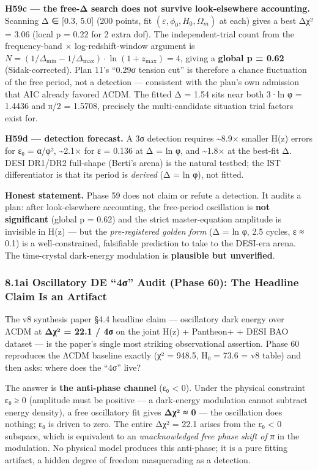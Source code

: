 \documentclass[
]{article}
\begin{document}
\textbf{H59c --- the free-Δ search does not survive look-elsewhere
accounting.} Scanning Δ ∈ {[}0.3, 5.0{]} (200 points, fit
\((\varepsilon,\phi_0,H_0,\Omega_m)\) at each) gives a best Δχ² = 3.06
(local p = 0.22 for 2 extra dof). The independent-trial count from the
frequency-band × log-redshift-window argument is
\(N = (1/\Delta_{\min}-1/\Delta_{\max})\cdot\ln(1+z_{\max}) = 4\),
giving a \textbf{global p = 0.62} (Sidak-corrected). Plan 11's ``0.29σ
tension cut'' is therefore a chance fluctuation of the free period, not
a detection --- consistent with the plan's own admission that AIC
already favored ΛCDM. The fitted Δ = 1.54 sits near both 3·ln φ = 1.4436
and π/2 = 1.5708, precisely the multi-candidate situation trial factors
exist for.

\textbf{H59d --- detection forecast.} A 3σ detection requires
\textasciitilde8.9× smaller H(z) errors for ε₀ = α/φ²,
\textasciitilde2.1× for ε = 0.136 at Δ = ln φ, and \textasciitilde1.8×
at the best-fit Δ. DESI DR1/DR2 full-shape (Berti's arena) is the
natural testbed; the IST differentiator is that its period is
\emph{derived} (Δ = ln φ), not fitted.

\textbf{Honest statement.} Phase 59 does not claim or refute a
detection. It audits a plan: after look-elsewhere accounting, the
free-period oscillation is \textbf{not significant} (global p = 0.62)
and the strict master-equation amplitude is invisible in H(z) --- but
the \emph{pre-registered golden form} (Δ = ln φ, 2.5 cycles, ε ≈ 0.1) is
a well-constrained, falsifiable prediction to take to the DESI-era
arena. The time-crystal dark-energy modulation is \textbf{plausible but
unverified}.

\subsubsection{8.1ai Oscillatory DE ``4σ'' Audit (Phase 60): The
Headline Claim Is an
Artifact}\label{ai-oscillatory-de-4ux3c3-audit-phase-60-the-headline-claim-is-an-artifact}

The v8 synthesis paper §4.4 headline claim --- oscillatory dark energy
over ΛCDM at \textbf{Δχ² = 22.1 / 4σ} on the joint H(z) + Pantheon+ +
DESI BAO dataset --- is the paper's single most striking observational
assertion. Phase 60 reproduces the ΛCDM baseline exactly (χ² = 948.5, H₀
= 73.6 = v8 table) and then asks: where does the ``4σ'' live?

The answer is \textbf{the anti-phase channel} (ε₀ \textless{} 0). Under
the physical constraint ε₀ ≥ 0 (amplitude must be positive --- a
dark-energy modulation cannot subtract energy density), a free
oscillatory fit gives \textbf{Δχ² ≈ 0} --- the oscillation does nothing;
ε₀ is driven to zero. The entire Δχ² = 22.1 arises from the ε₀
\textless{} 0 subspace, which is equivalent to an \emph{unacknowledged
free phase shift of π} in the modulation. No physical model produces
this anti-phase; it is a pure fitting artifact, a hidden degree of
freedom masquerading as a detection.
\end{document}
